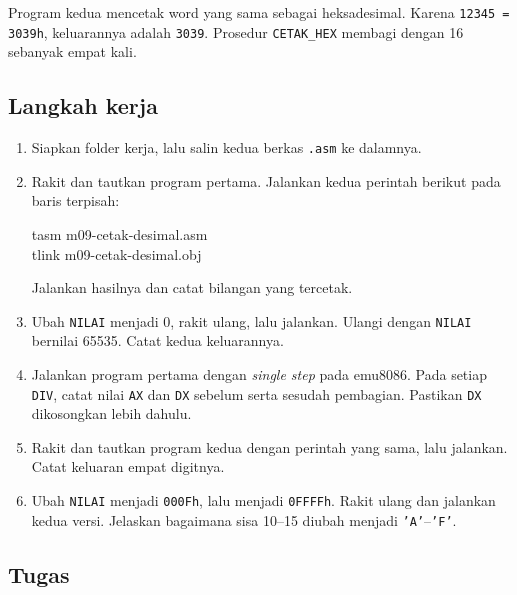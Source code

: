

Program kedua mencetak word yang sama sebagai heksadesimal. Karena
\texttt{12345 = 3039h}, keluarannya adalah \texttt{3039}. Prosedur
\texttt{CETAK\_HEX} membagi dengan 16 sebanyak empat kali.



\subsection{Langkah kerja}

\begin{enumerate}
    \item Siapkan folder kerja, lalu salin kedua berkas \texttt{.asm}
          ke dalamnya.
    \item Rakit dan tautkan program pertama. Jalankan kedua perintah
          berikut pada baris terpisah:
          \begin{perintah}
tasm m09-cetak-desimal.asm\\
tlink m09-cetak-desimal.obj
\end{perintah}
          Jalankan hasilnya dan catat bilangan yang tercetak.
    \item Ubah \texttt{NILAI} menjadi 0, rakit ulang, lalu jalankan.
          Ulangi dengan \texttt{NILAI} bernilai 65535. Catat kedua
          keluarannya.
    \item Jalankan program pertama dengan \emph{single step} pada
          emu8086. Pada setiap \texttt{DIV}, catat nilai \texttt{AX}
          dan \texttt{DX} sebelum serta sesudah pembagian. Pastikan
          \texttt{DX} dikosongkan lebih dahulu.
    \item Rakit dan tautkan program kedua dengan perintah yang sama,
          lalu jalankan. Catat keluaran empat digitnya.
    \item Ubah \texttt{NILAI} menjadi \texttt{000Fh}, lalu menjadi
          \texttt{0FFFFh}. Rakit ulang dan jalankan kedua versi.
          Jelaskan bagaimana sisa 10--15 diubah menjadi
          \texttt{'A'}--\texttt{'F'}.
\end{enumerate}

\subsection{Tugas}

